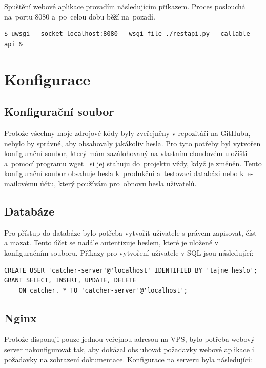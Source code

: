 Spuštění webové aplikace provadím následujícím příkazem. Proces poslouchá na~portu 8080 a~po~celou dobu běží na~pozadí.

\begingroup
\fontsize{9.5pt}{11pt}\selectfont
\begin{verbatim}
$ uwsgi --socket localhost:8080 --wsgi-file ./restapi.py --callable api &
\end{verbatim}
\endgroup

\section{Konfigurace}

\subsection*{Konfigurační soubor}

Protože všechny moje zdrojové kódy byly zveřejněny v repozitáři na GitHubu, nebylo by správné, aby obsahovaly jakákoliv hesla.
Pro tyto potřeby byl vytvořen konfigurační soubor, který mám zazálohovaný na vlastním cloudovém uložišti
a~pomocí programu wget~\cite{wget} si jej stahuju do~projektu vždy, když je změněn.
Tento konfigurační soubor obsahuje hesla k~produkční a~testovací databázi
nebo k~e-mailovému účtu, který používám pro~obnovu hesla uživatelů.

\subsection*{Databáze}

Pro přístup do databáze bylo potřeba vytvořit uživatele s právem zapisovat, číst a mazat.
Tento účet se nadále autentizuje heslem, které je uložené v konfiguračním souboru.
Příkazy pro vytvoření uživatele v SQL jsou následující:

\begingroup
\fontsize{9.5pt}{11pt}\selectfont
\begin{verbatim}
CREATE USER 'catcher-server'@'localhost' IDENTIFIED BY 'tajne_heslo';
GRANT SELECT, INSERT, UPDATE, DELETE
    ON catcher. * TO 'catcher-server'@'localhost';
\end{verbatim}
\endgroup

\subsection*{Nginx}

Protože disponuji pouze jednou veřejnou adresou na VPS, bylo potřeba webový server nakonfigurovat tak,
aby dokázal obsluhovat požadavky webové aplikace i požadavky
na zobrazení dokumentace. Konfigurace na serveru byla následující:

